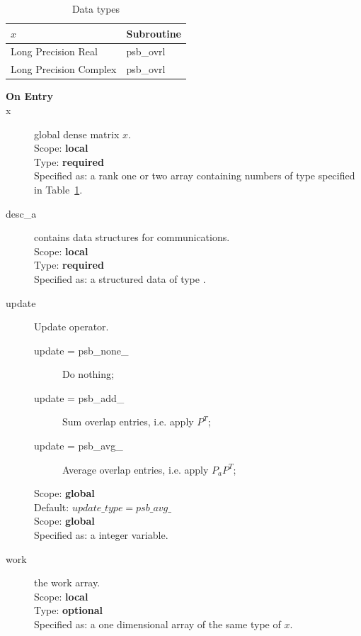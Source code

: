 \begin{table}[h]
\begin{center}
\begin{tabular}{ll}
\hline
$x$ & {\bf Subroutine}\\
\hline
Long Precision Real & psb\_ovrl \\
Long Precision Complex & psb\_ovrl \\
\hline
\end{tabular}
\end{center}
\caption{Data types\label{tab:f90ovrl}}
\end{table}


\begin{description}
\item[\bf On Entry]
\item[x] global dense matrix $x$.\\
Scope: {\bf local} \\
Type: {\bf required} \\
Specified as:  a rank one or two array 
containing numbers of type specified in
Table~\ref{tab:f90ovrl}.
\item[desc\_a] contains data structures for communications.\\
Scope: {\bf local} \\
Type: {\bf required}\\
Specified as: a structured data of type \descdata.
\item[update] Update operator. \\
\begin{description}
\item[update = psb\_none\_] Do nothing;
\item[update = psb\_add\_] Sum overlap entries, i.e. apply $P^T$;
\item[update = psb\_avg\_] Average overlap entries, i.e. apply $P_aP^T$;
\end{description}
Scope: {\bf global} \\
Default: $update\_type = psb\_avg\_ $\\	
Scope: {\bf global} \\
Specified as: a integer variable.
\item[work] the work array. \\
Scope: {\bf local} \\
Type: {\bf optional}\\
Specified as: a one dimensional array of the same type of $x$.


\end{description}
